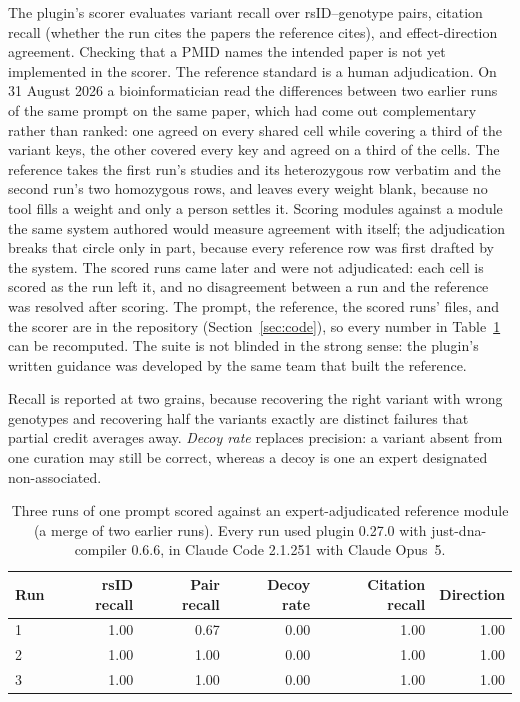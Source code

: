 \documentclass[11pt,a4paper]{article}
\begin{document}
The plugin's scorer evaluates variant recall over
rsID--genotype pairs, citation recall (whether the run cites the papers the
reference cites), and
effect-direction agreement. Checking that a PMID names the intended paper is
not yet implemented in the scorer. The reference standard is a human
adjudication. On 31 August 2026 a bioinformatician read the differences
between two earlier runs of the same prompt on the same paper, which had come
out complementary rather than ranked: one agreed on every shared cell while
covering a third of the variant keys, the other covered every key and agreed
on a third of the cells. The reference takes the first run's studies and its
heterozygous row verbatim and the second run's two homozygous rows, and leaves
every weight blank, because no tool fills a weight and only a person settles
it. Scoring modules against a module the same system authored would measure
agreement with itself; the adjudication breaks that circle only in part,
because every reference row was first drafted by the system. The scored runs
came later and were not adjudicated: each cell is scored as the run left it,
and no disagreement between a run and the reference was resolved after
scoring. The prompt, the reference, the scored runs' files, and the scorer are
in the repository (Section~\ref{sec:code}), so every number in
Table~\ref{tab:scores} can be recomputed. The suite is not blinded in the
strong sense: the plugin's written guidance was developed by the same team
that built the reference.

Recall is reported at two
grains, because recovering the right variant with wrong genotypes and
recovering half the variants exactly are distinct failures that partial
credit averages away. \emph{Decoy rate} replaces precision: a variant
absent from one curation may still be correct, whereas a decoy is one an
expert designated non-associated.

\begin{table}[ht]
\centering
\small
\caption{Three runs of one prompt scored against an expert-adjudicated
reference module (a merge of two earlier runs). Every run used plugin 0.27.0
with just-dna-compiler 0.6.6, in Claude Code 2.1.251 with Claude Opus~5.}
\label{tab:scores}
\begin{tabular}{@{}lrrrrr@{}}
\toprule
Run & rsID recall & Pair recall & Decoy rate & Citation recall & Direction \\
\midrule
1 & 1.00 & 0.67 & 0.00 & 1.00 & 1.00 \\
2 & 1.00 & 1.00 & 0.00 & 1.00 & 1.00 \\
3 & 1.00 & 1.00 & 0.00 & 1.00 & 1.00 \\
\bottomrule
\end{tabular}
\end{table}
\end{document}
